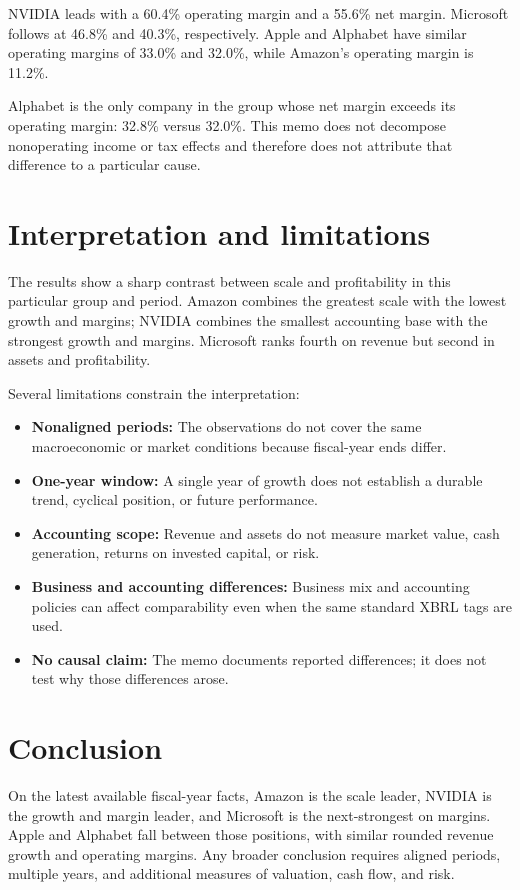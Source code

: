 \documentclass[11pt]{article}
\begin{document}
NVIDIA leads with a 60.4\% operating margin and a 55.6\% net margin. Microsoft follows at 46.8\% and 40.3\%, respectively. Apple and Alphabet have similar operating margins of 33.0\% and 32.0\%, while Amazon's operating margin is 11.2\%.

Alphabet is the only company in the group whose net margin exceeds its operating margin: 32.8\% versus 32.0\%. This memo does not decompose nonoperating income or tax effects and therefore does not attribute that difference to a particular cause.

\section*{Interpretation and limitations}

The results show a sharp contrast between scale and profitability in this particular group and period. Amazon combines the greatest scale with the lowest growth and margins; NVIDIA combines the smallest accounting base with the strongest growth and margins. Microsoft ranks fourth on revenue but second in assets and profitability.

Several limitations constrain the interpretation:

\begin{itemize}
    \item \textbf{Nonaligned periods:} The observations do not cover the same macroeconomic or market conditions because fiscal-year ends differ.
    \item \textbf{One-year window:} A single year of growth does not establish a durable trend, cyclical position, or future performance.
    \item \textbf{Accounting scope:} Revenue and assets do not measure market value, cash generation, returns on invested capital, or risk.
    \item \textbf{Business and accounting differences:} Business mix and accounting policies can affect comparability even when the same standard XBRL tags are used.
    \item \textbf{No causal claim:} The memo documents reported differences; it does not test why those differences arose.
\end{itemize}

\section*{Conclusion}

On the latest available fiscal-year facts, Amazon is the scale leader, NVIDIA is the growth and margin leader, and Microsoft is the next-strongest on margins. Apple and Alphabet fall between those positions, with similar rounded revenue growth and operating margins. Any broader conclusion requires aligned periods, multiple years, and additional measures of valuation, cash flow, and risk.
\end{document}
